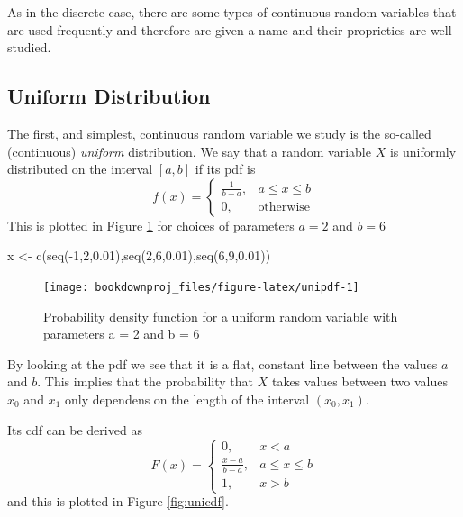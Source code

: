 \documentclass[
]{book}
\newenvironment{Shaded}{\begin{snugshade}}{\end{snugshade}}
\newcommand{\DecValTok}[1]{\textcolor[rgb]{0.00,0.00,0.81}{#1}}
\newcommand{\FloatTok}[1]{\textcolor[rgb]{0.00,0.00,0.81}{#1}}
\newcommand{\FunctionTok}[1]{\textcolor[rgb]{0.00,0.00,0.00}{#1}}
\newcommand{\NormalTok}[1]{#1}
\newcommand{\OtherTok}[1]{\textcolor[rgb]{0.56,0.35,0.01}{#1}}
\newcommand{\SpecialCharTok}[1]{\textcolor[rgb]{0.00,0.00,0.00}{#1}}
\theoremstyle{definition}
\theoremstyle{definition}
\theoremstyle{definition}
\theoremstyle{definition}
\theoremstyle{remark}
\begin{document}
As in the discrete case, there are some types of continuous random variables that are used frequently and therefore are given a name and their proprieties are well-studied.

\hypertarget{uniform-distribution}{%
\subsection{Uniform Distribution}\label{uniform-distribution}}

The first, and simplest, continuous random variable we study is the so-called (continuous) \emph{uniform} distribution. We say that a random variable \(X\) is uniformly distributed on the interval \([a,b]\) if its pdf is
\[
f(x)=\left\{ 
\begin{array}{ll}
\frac{1}{b-a}, & a\leq x \leq b\\
0, & \mbox{otherwise} 
\end{array}
\right.
\]
This is plotted in Figure \ref{fig:unipdf} for choices of parameters \(a=2\) and \(b=6\)

\begin{Shaded}
\begin{Highlighting}[]
\NormalTok{x }\OtherTok{\textless{}{-}} \FunctionTok{c}\NormalTok{(}\FunctionTok{seq}\NormalTok{(}\SpecialCharTok{{-}}\DecValTok{1}\NormalTok{,}\DecValTok{2}\NormalTok{,}\FloatTok{0.01}\NormalTok{),}\FunctionTok{seq}\NormalTok{(}\DecValTok{2}\NormalTok{,}\DecValTok{6}\NormalTok{,}\FloatTok{0.01}\NormalTok{),}\FunctionTok{seq}\NormalTok{(}\DecValTok{6}\NormalTok{,}\DecValTok{9}\NormalTok{,}\FloatTok{0.01}\NormalTok{))}
\end{Highlighting}
\end{Shaded}

\begin{figure}

{\centering \texttt{[image: bookdownproj\_files/figure-latex/unipdf-1]} 

}

\caption{Probability density function for a uniform random variable with parameters a = 2 and b = 6}\label{fig:unipdf}
\end{figure}

By looking at the pdf we see that it is a flat, constant line between the values \(a\) and \(b\). This implies that the probability that \(X\) takes values between two values \(x_0\) and \(x_1\) only dependens on the length of the interval \((x_0,x_1)\).

Its cdf can be derived as
\[
F(x)=\left\{
\begin{array}{ll}
0, & x<a\\
\frac{x-a}{b-a}, & a\leq x \leq b\\
1, & x>b
\end{array}
\right.
\]
and this is plotted in Figure \ref{fig:unicdf}.
\end{document}
